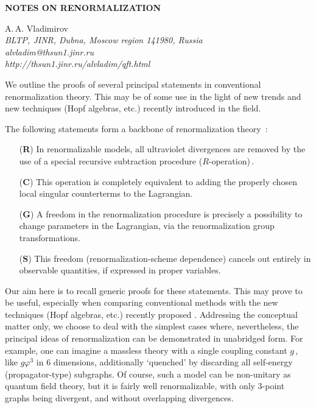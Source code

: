 \documentclass[a4paper,12pt]{article}
\begin{document}
\begin{center}
{\bf NOTES ON RENORMALIZATION}
\end{center}

\vspace*{-.1cm}

\begin{center}
{\sc A.\,A. Vladimirov} \\[.1cm]
{\em BLTP, JINR, Dubna, Moscow region 141980, Russia \\
alvladim@thsun1.jinr.ru \\
http://thsun1.jinr.ru/{}alvladim/qft.html}
\end{center}

\vspace{.7cm}

{\small
We outline the proofs of several principal statements in conventional
renormalization theory. This may be of some use in the light of new trends
and new techniques (Hopf algebras, etc.) recently introduced in the field.
}

\vspace{1cm}

The following statements form a backbone of renormalization theory
\cite{Co}\,:
\begin{itemize}
  \item[(\textbf R)] In renormalizable models, all ultraviolet divergences
are removed by the use of a special recursive subtraction procedure
($R$-operation)\,.
  \item[(\textbf C)] This operation is completely equivalent to adding
the properly chosen local singular counterterms to the Lagrangian.
  \item[(\textbf G)] A freedom in the renormalization procedure is
precisely a possibility to change parameters in the
Lagrangian, via the renormalization group transformations.
\item[(\textbf S)] This freedom (renormalization-scheme dependence) cancels
out entirely in observable quantities, if expressed in proper variables.
\end{itemize}

Our aim here is to recall generic proofs for these statements. This may
prove to be useful, especially when comparing conventional methods with the
new techniques (Hopf algebras, etc.) recently proposed \cite{CK}.
Addressing the conceptual matter only, we choose to deal with
the simplest cases where, nevertheless, the principal ideas of renormalization
can be demonstrated in unabridged form. For example, one can imagine a
massless theory with a single coupling constant $g$\,, like $g\varphi^3$
in 6 dimensions, additionally `quenched' by discarding all self-energy
(propagator-type) subgraphs. Of course, such a model can be non-unitary as
quantum field theory, but it is fairly well renormalizable, with only
3-point graphs being divergent, and without overlapping divergences.
\end{document}
